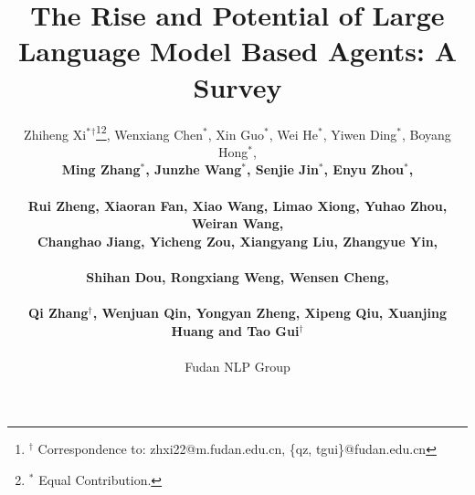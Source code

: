 \documentclass{article}
\title{The Rise and Potential of Large Language Model Based Agents: A Survey}
\author{%
    Zhiheng Xi$^*$$^\dag$\thanks{$^\dag${ }{ }Correspondence to: zhxi22@m.fudan.edu.cn, \{qz, tgui\}@fudan.edu.cn }\thanks{$^*${ }{ }Equal Contribution.}, Wenxiang Chen$^*$, Xin Guo$^*$, Wei He$^*$, Yiwen Ding$^*$,  Boyang Hong$^*$, \\ \textbf{Ming Zhang$^*$, Junzhe Wang$^*$, Senjie Jin$^*$, Enyu Zhou$^*$,} \\ \\ \textbf{Rui Zheng,  Xiaoran Fan, Xiao Wang, Limao Xiong, Yuhao Zhou, Weiran Wang,} \\ 
    \textbf{ Changhao Jiang, Yicheng Zou, Xiangyang Liu, Zhangyue Yin,} 
    \\ \\
    \textbf{Shihan Dou, Rongxiang Weng, Wensen Cheng,}
    \\ \\ \textbf{Qi Zhang$^\dag$, Wenjuan Qin, Yongyan Zheng, Xipeng Qiu, Xuanjing Huang and Tao Gui$^\dag$}
  \\ \\
  \large Fudan NLP Group
}
\begin{document}
\maketitle


\begin{abstract}





\end{abstract}
\end{document}
